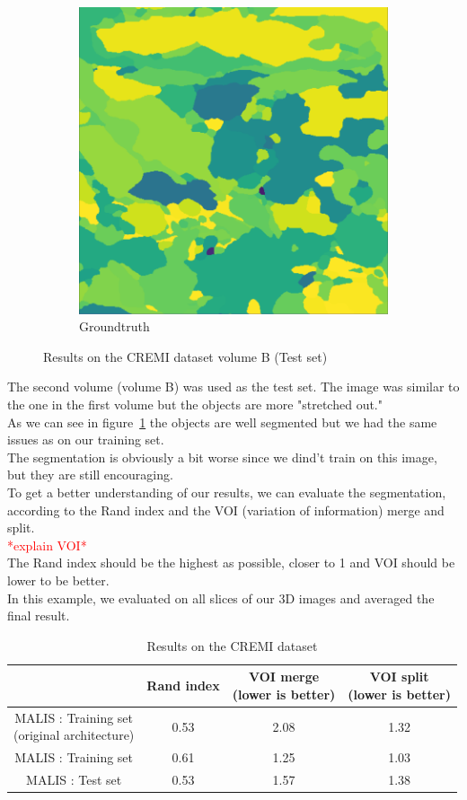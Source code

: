 \begin{figure}[!htbp]
\begin{subfigure}[t]{0.31\textwidth}
        \includegraphics[height=0.7\textwidth]{./images/cremi_gt_2.png}
        \caption{Groundtruth}
    \end{subfigure}
	\caption{Results on the CREMI dataset volume B (Test set)}
	\label{fig:cremi_results_b}
\end{figure}

The second volume (volume B) was used as the test set.
The image was similar to the one in the first volume but the objects are more
"stretched out."\\
As we can see in figure~\ref{fig:cremi_results_b} the objects are well
segmented but we had the same issues as on our training set.\\
The segmentation is obviously a bit worse since we dind't train on this image,
but they are still encouraging.\\

To get a better understanding of our results, we can evaluate the segmentation, 
according to the Rand index and the VOI (variation of information) merge and split.\\ 
\textcolor{red}{*explain VOI*\\}
The Rand index should be the highest as possible, closer to 1 and VOI should be lower to be better.\\
In this example, we evaluated on all slices of our 3D images and averaged the
final result.\\

\begin{table}[!htbp]
	\centering
	\begin{tabular}{|c|c|c|c|}
		\hline
		& Rand index & \thead{VOI merge \\(lower is better)} & \thead{VOI split\\(lower is better)} \\
		\hline
		\makecell{MALIS : Training set \\(original architecture)} & 0.53 & 2.08 & 1.32\\
		\hline
		MALIS : Training set & 0.61 & 1.25 & 1.03\\
		\hline
		MALIS : Test set & 0.53 & 1.57 & 1.38\\
		\hline
	\end{tabular}
	\caption{Results on the CREMI dataset}
\label{tab:cremi_res}
\end{table}

